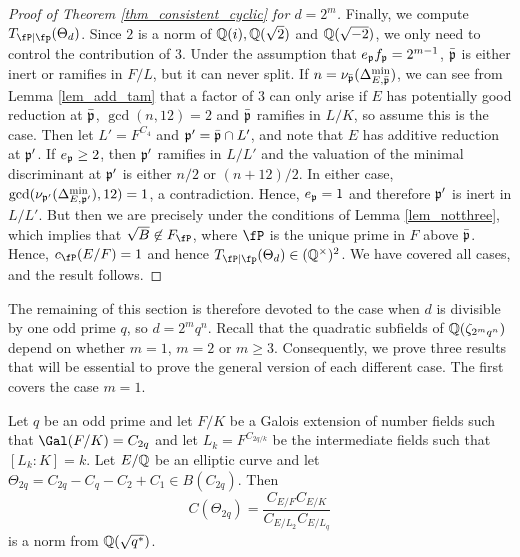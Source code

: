 \begin{proof}[Proof of Theorem \ref{thm_consistent_cyclic} for $d=2^m$]
    Finally, we compute $\Tp(\Theta_d)$. Since $2$ is a norm of $\mathbb{Q}(i),\mathbb{Q}(\sqrt{2})$ and $\mathbb{Q}(\sqrt{-2})$, we only need to control the contribution of $3$. Under the assumption that $e_{\mathfrak{p}} f_{\mathfrak{p}}=2^{m-1}$, $\bar{\mathfrak{p}}$ is either inert or ramifies in $F/L$, but it can never split. If $n=\nu_{\bar{\mathfrak{p}}}(\Delta_{E,\bar{\mathfrak{p}}}^{\min})$, we can see from Lemma \ref{lem_add_tam} that a factor of $3$ can only arise if $E$ has potentially good reduction at $\bar{\mathfrak{p}}$, $\gcd(n,12)=2$ and $\bar{\mathfrak{p}}$ ramifies in $L/K$, so assume this is the case. Then let $L'=F^{C_4}$ and $\mathfrak{p}'=\bar{\mathfrak{p}}\cap L'$, and note that $E$ has additive reduction at $\mathfrak{p}'$. If $e_{\mathfrak{p}}\geq 2$, then $\mathfrak{p}'$ ramifies in $L/L'$ and the valuation of the minimal discriminant at $\mathfrak{p}'$ is either $n/2$ or $(n+12)/2$. In either case, $\gcd(\nu_{\mathfrak{p}'}(\Delta_{E,\mathfrak{p}'}^{\min}),12)=1$, a contradiction. Hence, $e_{\mathfrak{p}}=1$ and therefore $\mathfrak{p}'$ is inert in $L/L'$. But then we are precisely under the conditions of Lemma \ref{lem_notthree}, which implies that $\sqrt{B}\not\in F_\fP$, where $\fP$ is the unique prime in $F$ above $\bar{\mathfrak{p}}$. Hence, $c_\fP(E/F)=1$ and hence $\Tp(\Theta_d)\in\QQss$. We have covered all cases, and the result follows.
\end{proof}

The remaining of this section is therefore devoted to the case when $d$ is divisible by one odd prime $q$, so $d=2^mq^n$. 
Recall that the quadratic subfields of $\mathbb{Q}(\zeta_{2^mq^n})$ depend on whether $m=1$, $m=2$ or $m\geq 3$. Consequently, we prove three results that will be essential to prove the general version of each different case. The first covers the case $m=1$.

\begin{lemma}\label{lem_C2p}
    Let $q$ be an odd prime and let $F/K$ be a Galois extension of number fields such that $\Gal(F/K)=C_{2q}$ and let $L_k=F^{C_{2q/k}}$ be the intermediate fields such that $[L_k:K]=k$. Let $E/\mathbb{Q}$ be an elliptic curve and let $\Theta_{2q}=C_{2q}-C_q-C_2+C_1\in B(C_{2q})$. Then
    $$C(\Theta_{2q})=\frac{C_{E/F}C_{E/K}}{C_{E/L_2}C_{E/L_q}}$$
    is a norm from $\mathbb{Q}(\sqrt{q^*})$.
\end{lemma}

